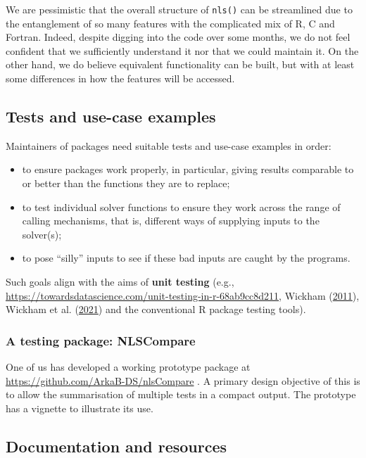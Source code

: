 \documentclass[
]{article}
\providecommand{\tightlist}{%
  \setlength{\itemsep}{0pt}\setlength{\parskip}{0pt}}
\begin{document}
We are pessimistic that the overall structure of \texttt{nls()} can be
streamlined due to the entanglement of so many features with the
complicated mix of R, C and Fortran. Indeed, despite digging into the
code over some months, we do not feel confident that we sufficiently
understand it nor that we could maintain it. On the other hand, we do
believe equivalent functionality can be built, but with at least some
differences in how the features will be accessed.

\hypertarget{tests-and-use-case-examples}{%
\subsection{Tests and use-case
examples}\label{tests-and-use-case-examples}}

Maintainers of packages need suitable tests and use-case examples in
order:

\begin{itemize}
\tightlist
\item
  to ensure packages work properly, in particular, giving results
  comparable to or better than the functions they are to replace;
\item
  to test individual solver functions to ensure they work across the
  range of calling mechanisms, that is, different ways of supplying
  inputs to the solver(s);
\item
  to pose ``silly'' inputs to see if these bad inputs are caught by the
  programs.
\end{itemize}

Such goals align with the aims of \textbf{unit testing} (e.g.,
\url{https://towardsdatascience.com/unit-testing-in-r-68ab9cc8d211},
Wickham (\protect\hyperlink{ref-HWtestthat11}{2011}), Wickham et al.
(\protect\hyperlink{ref-HWdevtools21}{2021}) and the conventional R
package testing tools).

\hypertarget{a-testing-package-nlscompare}{%
\subsubsection{A testing package:
NLSCompare}\label{a-testing-package-nlscompare}}

One of us has developed a working prototype package at
\url{https://github.com/ArkaB-DS/nlsCompare} . A primary design
objective of this is to allow the summarisation of multiple tests in a
compact output. The prototype has a vignette to illustrate its use.

\hypertarget{documentation-and-resources}{%
\subsection{Documentation and
resources}\label{documentation-and-resources}}
\end{document}

